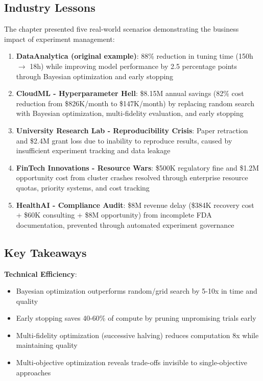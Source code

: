 \subsection{Industry Lessons}

The chapter presented five real-world scenarios demonstrating the business impact of experiment management:

\begin{enumerate}
    \item \textbf{DataAnalytica (original example)}: 88\% reduction in tuning time (150h $\rightarrow$ 18h) while improving model performance by 2.5 percentage points through Bayesian optimization and early stopping

    \item \textbf{CloudML - Hyperparameter Hell}: \$8.15M annual savings (82\% cost reduction from \$826K/month to \$147K/month) by replacing random search with Bayesian optimization, multi-fidelity evaluation, and early stopping

    \item \textbf{University Research Lab - Reproducibility Crisis}: Paper retraction and \$2.4M grant loss due to inability to reproduce results, caused by insufficient experiment tracking and data leakage

    \item \textbf{FinTech Innovations - Resource Wars}: \$500K regulatory fine and \$1.2M opportunity cost from cluster crashes resolved through enterprise resource quotas, priority systems, and cost tracking

    \item \textbf{HealthAI - Compliance Audit}: \$8M revenue delay (\$384K recovery cost + \$60K consulting + \$8M opportunity) from incomplete FDA documentation, prevented through automated experiment governance
\end{enumerate}

\subsection{Key Takeaways}

\textbf{Technical Efficiency}:
\begin{itemize}
    \item Bayesian optimization outperforms random/grid search by 5-10x in time and quality
    \item Early stopping saves 40-60\% of compute by pruning unpromising trials early
    \item Multi-fidelity optimization (successive halving) reduces computation 8x while maintaining quality
    \item Multi-objective optimization reveals trade-offs invisible to single-objective approaches
\end{itemize}

